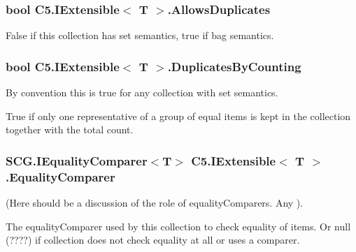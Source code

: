 \subsubsection[{Allows\+Duplicates}]{\setlength{\rightskip}{0pt plus 5cm}bool {\bf C5.\+I\+Extensible}$<$ T $>$.Allows\+Duplicates\hspace{0.3cm}{\ttfamily [get]}}\label{interface_c5_1_1_i_extensible_a1f2129ec206bc1a66e4a62874a67dff7}




False if this collection has set semantics, true if bag semantics.\hypertarget{interface_c5_1_1_i_extensible_ae44a9be32f369f1363b64e2c3c682342}{}
\subsubsection[{Duplicates\+By\+Counting}]{\setlength{\rightskip}{0pt plus 5cm}bool {\bf C5.\+I\+Extensible}$<$ T $>$.Duplicates\+By\+Counting\hspace{0.3cm}{\ttfamily [get]}}\label{interface_c5_1_1_i_extensible_ae44a9be32f369f1363b64e2c3c682342}


By convention this is true for any collection with set semantics. 

True if only one representative of a group of equal items is kept in the collection together with the total count.\hypertarget{interface_c5_1_1_i_extensible_a5693514400848e8b544eeffb6deed743}{}
\subsubsection[{Equality\+Comparer}]{\setlength{\rightskip}{0pt plus 5cm}S\+C\+G.\+I\+Equality\+Comparer$<$T$>$ {\bf C5.\+I\+Extensible}$<$ T $>$.Equality\+Comparer\hspace{0.3cm}{\ttfamily [get]}}\label{interface_c5_1_1_i_extensible_a5693514400848e8b544eeffb6deed743}


(Here should be a discussion of the role of equality\+Comparers. Any ). 

The equality\+Comparer used by this collection to check equality of items. Or null (????) if collection does not check equality at all or uses a comparer.\hypertarget{interface_c5_1_1_i_extensible_aedb0e17cd4e5d0f4a63750a5989b6706}{}
